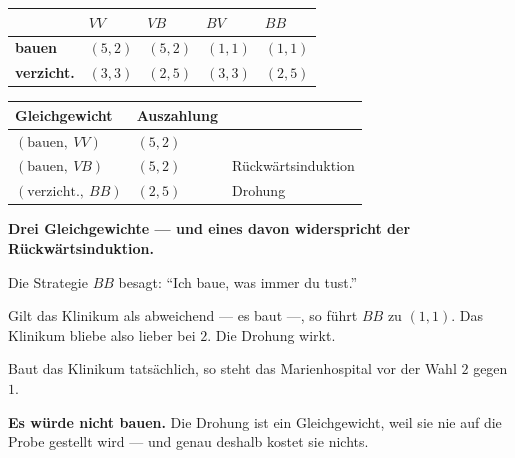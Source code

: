 \begin{merksatz}
\begin{center}
{\small
\renewcommand{\arraystretch}{1.6}
\begin{tabular}{@{}P{1.8cm}P{1.6cm}P{1.6cm}P{1.6cm}P{1.6cm}@{}}
\toprule
& $VV$ & $VB$ & $BV$ & $BB$\\
\midrule
\textbf{bauen} & $(5,2)$ & $(5,2)$ & $(1,1)$ & $(1,1)$\\
\textbf{verzicht.} & $(3,3)$ & $(2,5)$ & $(3,3)$ & $(2,5)$\\
\bottomrule
\end{tabular}}
\end{center}

\begin{center}
{\small
\renewcommand{\arraystretch}{1.5}
\begin{tabular}{@{}P{2.6cm}P{2.0cm}P{3.0cm}@{}}
\toprule
\textbf{Gleichgewicht} & \textbf{Aus\-zahlung} & \\
\midrule
$(\text{bauen},\ VV)$ & $(5,2)$ & \\
$(\text{bauen},\ VB)$ & $(5,2)$ & \textcolor{gruen}{Rückwärts\-induktion}\\
$(\text{verzicht.},\ BB)$ & $(2,5)$ & \textcolor{akzent}{Drohung}\\
\bottomrule
\end{tabular}}
\end{center}

\begin{center}
\begin{minipage}{0.9\textwidth}
\textbf{Drei Gleichgewichte --- und eines davon widerspricht der Rückwärtsinduktion.}
\end{minipage}
\end{center}

Die Strategie $BB$ besagt: \enquote{Ich baue, was immer du tust.}

 Gilt das Klinikum als abweichend --- es baut ---, so führt $BB$ zu $(1,1)$. Das Klinikum bliebe also lieber bei $2$. Die Drohung wirkt.

 Baut das Klinikum tatsächlich, so steht das Marienhospital vor der Wahl $2$ gegen $1$.

\begin{center}
\begin{minipage}{0.9\textwidth}
\textbf{Es würde nicht bauen.} Die Drohung ist ein Gleichgewicht, weil sie nie auf die Probe gestellt wird --- und genau deshalb kostet sie nichts.
\end{minipage}
\end{center}


\end{merksatz}
